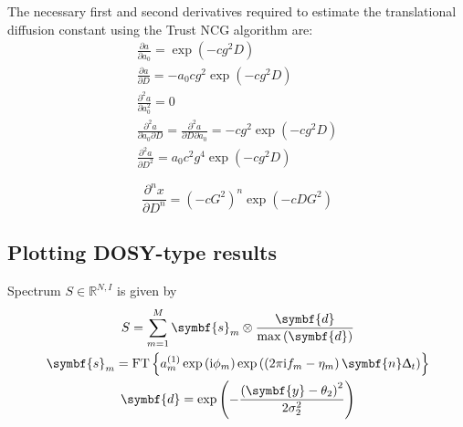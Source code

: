The necessary first and second derivatives required to estimate the translational diffusion constant using the \ac{Trust NCG} algorithm are:
\begin{subequations}
   \begin{gather}
       \frac{\partial a}{\partial a_0} = \exp\left(-c g^2 D\right) \\
       \frac{\partial a}{\partial D} = -a_0 c g^2 \exp\left(-c g^2 D\right) \\
       \frac{\partial^2 a}{\partial a_0^2} = 0\\
       \frac{\partial^2 a}{\partial a_0 \partial D} =
           \frac{\partial^2 a}{\partial D \partial a_0} =
           -c g^2 \exp\left(-c g^2 D\right) \\
       \frac{\partial^ 2 a}{\partial D^2} = a_0 c^2 g^4 \exp\left(-c g^2 D\right)
   \end{gather}
\end{subequations}

\begin{equation}
    \frac{\partial^n x}{\partial D^n} = \left(-c G^2\right)^n \exp\left(-c D G^2\right)
\end{equation}

\subsection{Plotting DOSY-type results}
Spectrum $S \in \mathbb{R}^{N, I}$ is given by
\begin{subequations}
    \begin{gather}
        S = \sum_{m=1}^M \symbf{s}_m \otimes \frac{\symbf{d}}{\max\left(\symbf{d}\right)} \\
        \symbf{s}_m = \FT\left\lbrace
            a^{(1)}_m \exp\left(\iu \phi_m\right) \exp\left(\left(2 \pi \iu f_m - \eta_m\right) \symbf{n} \Dt\right)
        \right\rbrace \\
        \symbf{d}  = \exp\left(
            -\frac{\left(\symbf{y} - \theta_2\right)^2}
            {2 \sigma_2^2}
        \right)
    \end{gather}
\end{subequations}
